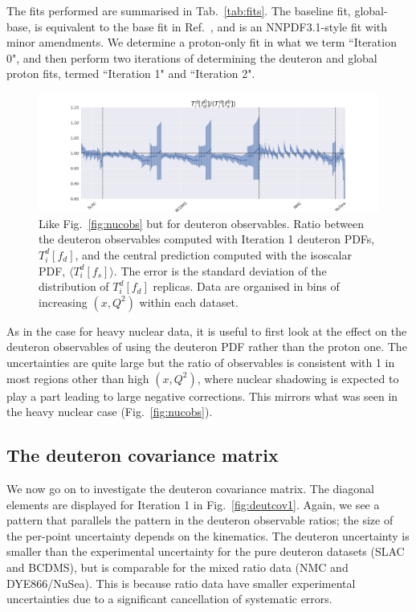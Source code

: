 The fits performed are summarised in Tab.~\ref{tab:fits}. The baseline fit, global-base, is equivalent to the base fit in Ref.~\cite{Faura:2020oom}, and is an NNPDF3.1-style fit with minor amendments. We determine a proton-only fit in what we term ``Iteration 0", and then perform two iterations of determining the deuteron and global proton fits, termed ``Iteration 1" and ``Iteration 2". 
\begin{figure}[h]
  \begin{center}
    \includegraphics[width=\linewidth, trim={4cm 0 4cm 0}]{nuclear/plots/observable_ratio_ite_1.png}
   \caption{ Like Fig.~\ref{fig:nucobs} but for deuteron observables. Ratio between the deuteron observables computed with Iteration 1 deuteron PDFs, $T_i^d[f_d]$, and the central prediction computed with the isoscalar PDF, $\langle T_i^d[f_s] \rangle$. The error is the standard deviation of the distribution of $T_i^d[f_d]$ replicas. Data are organised in bins of increasing $(x, Q^2)$ within each dataset. 
    \label{fig:deutobs} }
  \end{center}
\end{figure}

As in the case for heavy nuclear data, it is useful to first look at the effect on the deuteron observables of using the deuteron PDF rather than the proton one. The uncertainties are quite large but the ratio of observables is consistent with 1 in most regions other than high $(x, Q^2)$, where nuclear shadowing is expected to play a part leading to large negative corrections. This mirrors what was seen in the heavy nuclear case (Fig.~\ref{fig:nucobs}).

\subsection{The deuteron covariance matrix}
We now go on to investigate the deuteron covariance matrix. The diagonal elements are displayed for Iteration 1 in Fig.~\ref{fig:deutcov1}. Again, we see a pattern that parallels the pattern in the deuteron observable ratios; the size of the per-point uncertainty depends on the kinematics. The deuteron uncertainty is smaller than the experimental uncertainty for the  pure deuteron datasets (SLAC and BCDMS), but is comparable for the mixed ratio data (NMC and DYE866/NuSea). This is because ratio data have smaller experimental uncertainties due to a significant cancellation of systematic errors. 

